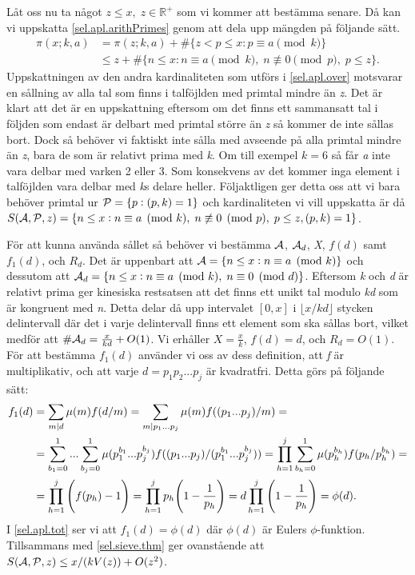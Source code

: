 Låt oss nu ta något \(z\leq x,\; z \in \mathbb{R}^+\) som vi kommer att bestämma senare. Då kan vi uppskatta \eqref{sel.apl.arithPrimes} genom att dela upp mängden på följande sätt.
\begin{align}
    \pi(x;k,a) &= \pi(z;k,a) + \#\{z<p\leq x: p \equiv a \pmod{k}\} \nonumber\\
    &\leq z + \#\{n\leq x: n \equiv a \pmod k,\; n \not\equiv 0 \pmod p,\; p\leq z\}.\label{sel.apl.over}
\end{align}
Uppskattningen av den andra kardinaliteten som utförs i \eqref{sel.apl.over} motsvarar en sållning av alla tal som finns i talföjlden med primtal mindre än \textit{z}. 
Det är klart att det är en uppskattning eftersom om det finns ett sammansatt tal i följden som endast är delbart med primtal större än \textit{z} så kommer de inte sållas bort. 
Dock så behöver vi faktiskt inte sålla med avseende på alla primtal mindre än \textit{z}, bara de som är relativt prima med \textit{k}. 
Om till exempel \(k = 6\) så får \textit{a} inte vara delbar med varken 2 eller 3.
Som konsekvens av det kommer inga element i talföjlden vara delbar med \textit{k}s delare heller.
Följaktligen ger detta oss att vi bara behöver primtal ur \(\P = \{p: (p, k) = 1\}\) och kardinaliteten vi vill uppskatta är då \(\S{A}{P}{z} = \{n\leq x: n \equiv a \pmod k,\; n \not\equiv 0 \pmod p,\; p\leq z, (p,k) = 1\}\).

För att kunna använda sållet så behöver vi bestämma \(\A\), \(\A_d\), \textit{X}, \(f(d)\) samt \(f_1(d)\), och \(R_d\). 
Det är uppenbart att \(\A = \{n\leq x: n \equiv a \pmod k\}\) och dessutom att \(\A_d = \{n \leq x: n \equiv a \pmod k,\; n \equiv 0 \pmod d\}\). 
Eftersom \textit{k} och \textit{d} är relativt prima ger kinesiska restsatsen att det finns ett unikt tal modulo \textit{kd} som är kongruent med \textit{n}. 
Detta delar då upp intervalet \([0, x]\) i \(\lfloor x/{kd}\rfloor\) stycken delintervall där det i varje delintervall finns ett element som ska sållas bort, vilket medför att \(\#\A_d = \frac{x}{kd} + O(1)\). 
Vi erhåller \(X = \frac{x}{k}\), \(f(d) = d\), och \(R_d = O(1)\). 
För att bestämma \(f_1(d)\) använder vi oss av dess definition, att \textit{f} är multiplikativ, och att varje \(d = p_1p_2...p_j\) är kvadratfri. 
Detta görs på följande sätt:
\begin{align}
    f_1(d) &= \sum_{m\divides d}\mu(m)f(d/m) = \sum_{m\divides p_1...p_j}\mu(m)f((p_1...p_j)/m) = \nonumber\\
    &=\sum_{b_1 = 0}^1...\sum_{b_j = 0}^1\mu(p_1^{b_1}...p_j^{b_j})f((p_1...p_j)/(p_1^{b_1}...p_j^{b_j})) = \prod_{h = 1}^j\sum_{b_h = 0}^1\mu(p_h^{b_h})f(p_h/p_h^{b_h}) = \nonumber\\
    &= \prod_{h = 1}^j\Bigg(f(p_h) - 1\Bigg) = \prod_{h = 1}^j p_h\Bigg(1 - \frac{1}{p_h}\Bigg) = d\prod_{h = 1}^j \Bigg(1 - \frac{1}{p_h}\Bigg) = \phi(d).\label{sel.apl.tot}
\end{align}
I \eqref{sel.apl.tot} ser vi att \(f_1(d) = \phi(d)\) där \(\phi(d)\) är Eulers \(\phi\)-funktion. 
Tillsammans med \ref{sel.sieve.thm} ger ovanstående att \(\S{A}{P}{z} \leq x/(kV(z)) + O(z^2)\). 

